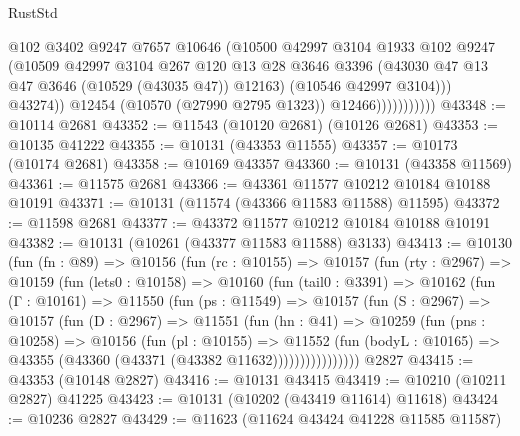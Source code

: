 \begin{lexlean}{RustStd}
\begin{coremodule}
                              @102
                              @3402
                              @9247
                              @7657
                              @10646
                              (@10500
                                @42997
                                @3104
                                @1933
                                @102
                                @9247
                                (@10509
                                  @42997
                                  @3104
                                  @267
                                  @120
                                  @13
                                  @28
                                  @3646
                                  @3396
                                  (@43030 @47 @13 @47 @3646 (@10529 (@43035 @47)) @12163)
                                  (@10546 @42997 @3104)))
                              @43274))
                          @12454
                          (@10570 (@27990 @2795 @1323))
                          @12466)))))))))))
@43348 := @10114 @2681
@43352 := @11543 (@10120 @2681) (@10126 @2681)
@43353 := @10135 @41222
@43355 := @10131 (@43353 @11555)
@43357 := @10173 (@10174 @2681)
@43358 := @10169 @43357
@43360 := @10131 (@43358 @11569)
@43361 := @11575 @2681
@43366 := @43361 @11577 @10212 @10184 @10188 @10191
@43371 := @10131 (@11574 (@43366 @11583 @11588) @11595)
@43372 := @11598 @2681
@43377 := @43372 @11577 @10212 @10184 @10188 @10191
@43382 := @10131 (@10261 (@43377 @11583 @11588) @3133)
@43413 := @10130
    (fun (fn : @89) =>
    @10156
      (fun (rc : @10155) =>
      @10157
        (fun (rty : @2967) =>
        @10159
          (fun (lets0 : @10158) =>
          @10160
            (fun (tail0 : @3391) =>
            @10162
              (fun (Γ : @10161) =>
              @11550
                (fun (ps : @11549) =>
                @10157
                  (fun (S : @2967) =>
                  @10157
                    (fun (D : @2967) =>
                    @11551
                      (fun (hn : @41) =>
                      @10259
                        (fun (pns : @10258) =>
                        @10156
                          (fun (pl : @10155) =>
                          @11552
                            (fun (bodyL : @10165) =>
                            @43355 (@43360 (@43371 (@43382 @11632))))))))))))))))
    @2827
@43415 := @43353 (@10148 @2827)
@43416 := @10131 @43415
@43419 := @10210 (@10211 @2827) @41225
@43423 := @10131 (@10202 (@43419 @11614) @11618)
@43424 := @10236 @2827
@43429 := @11623 (@11624 @43424 @41228 @11585 @11587)

\end{coremodule}
\end{lexlean}

